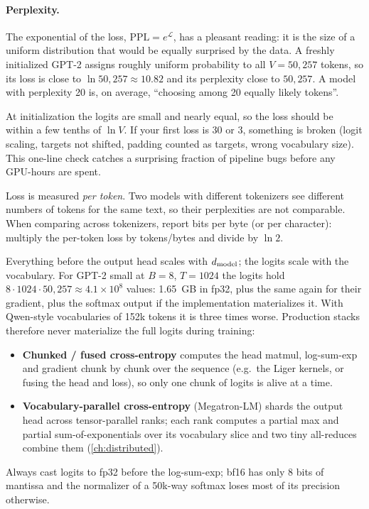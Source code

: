 \paragraph{Perplexity.} The exponential of the loss, $\mathrm{PPL}=e^{\mathcal L}$, has a
pleasant reading: it is the size of a uniform distribution that would be equally surprised by
the data. A freshly initialized GPT-2 assigns roughly uniform probability to all $V=50{,}257$
tokens, so its loss is close to $\ln 50{,}257 \approx 10.82$ and its perplexity close to
$50{,}257$. A model with perplexity 20 is, on average, ``choosing among 20 equally likely
tokens''.

\begin{keyidea}
At initialization the logits are small and nearly equal, so the loss should be within a few
tenths of $\ln V$. If your first loss is 30 or 3, something is broken (logit scaling,
targets not shifted, padding counted as targets, wrong vocabulary size). This one-line check
catches a surprising fraction of pipeline bugs before any GPU-hours are spent.
\end{keyidea}

\begin{pitfall}
Loss is measured \emph{per token}. Two models with different tokenizers see different numbers
of tokens for the same text, so their perplexities are not comparable. When comparing across
tokenizers, report bits per byte (or per character): multiply the per-token loss by
tokens/bytes and divide by $\ln 2$.
\end{pitfall}

\begin{systemslens}
Everything before the output head scales with $d_{\text{model}}$; the logits scale with the vocabulary.
For GPT-2 small at $B=8$, $T=1024$ the logits hold $8\cdot1024\cdot50{,}257\approx4.1\times10^8$
values: \SI{1.65}{GB} in fp32, plus the same again for their gradient, plus the softmax output
if the implementation materializes it. With Qwen-style vocabularies of 152k tokens it is three
times worse. Production stacks therefore never materialize the full logits during training:
\begin{itemize}
  \item \textbf{Chunked / fused cross-entropy} computes the head matmul, log-sum-exp and
    gradient chunk by chunk over the sequence (e.g.\ the Liger kernels, or 
    fusing the head and loss), so only one chunk of logits is alive at a time.
  \item \textbf{Vocabulary-parallel cross-entropy} (Megatron-LM) shards the output head across
    tensor-parallel ranks; each rank computes a partial max and partial sum-of-exponentials over
    its vocabulary slice and two tiny all-reduces combine them (\cref{ch:distributed}).
\end{itemize}
Always cast logits to fp32 before the log-sum-exp; bf16 has only 8 bits of mantissa and the
normalizer of a 50k-way softmax loses most of its precision otherwise.
\end{systemslens}

